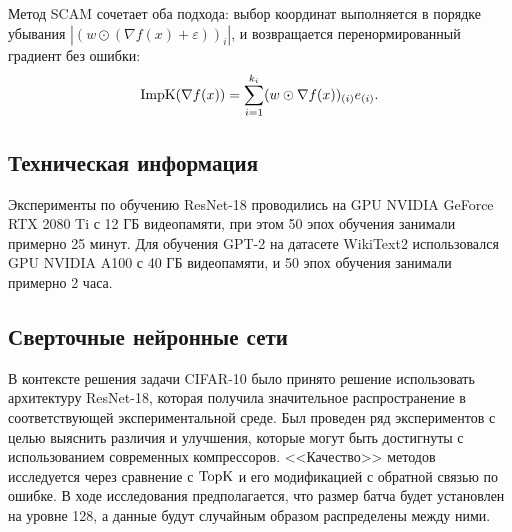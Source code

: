     Метод SCAM сочетает оба подхода: выбор координат выполняется в порядке убывания $|(w \odot (\nabla f(x) + \varepsilon))_i|$, и возвращается перенормированный градиент без ошибки:
    \begin{align*}
        \operatorname{ImpK}(\nabla f(x)) = \sum_{i=1}^{k_i} (w \odot \nabla f(x))_{(i)} e_{(i)}.
    \end{align*}

\subsection{Техническая информация}
    Эксперименты по обучению ResNet-18 проводились на GPU NVIDIA GeForce RTX 2080 Ti с 12 ГБ видеопамяти, при этом 50 эпох обучения занимали примерно 25 минут. Для обучения GPT-2 на датасете WikiText2 использовался GPU NVIDIA A100 с 40 ГБ видеопамяти, и 50 эпох обучения занимали примерно 2 часа.

\subsection{Сверточные нейронные сети}

    В контексте решения задачи CIFAR-10 было принято решение использовать архитектуру ResNet-18, которая получила значительное распространение в соответствующей экспериментальной среде. Был проведен ряд экспериментов с целью выяснить различия и улучшения, которые могут быть достигнуты с использованием современных компрессоров. <<Качество>> методов исследуется через сравнение с $\operatorname{TopK}$ и его модификацией с обратной связью по ошибке. В ходе исследования предполагается, что размер батча будет установлен на уровне 128, а данные будут случайным образом распределены между ними.

